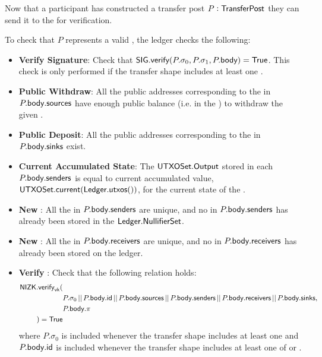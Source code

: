 Now that a participant has constructed a transfer post $P : {\textsf{TransferPost}}$ they can send it to the \Ledger{} for verification. 

\begin{definition}
    To check that $P$ represents a valid \Transfer{}, the ledger checks the following:
    \begin{itemize}
        \item \textbf{Verify Signature}: Check that ${\textsf{SIG}}.{\textsf{verify}}(P.\sigma_0, P.\sigma_1, P.{\textsf{body}}) = {\textsf{True}}$. This check is only performed if the transfer shape includes at least one \Sender{}.
        \item \textbf{Public Withdraw}: All the public addresses corresponding to the  in $P.{\textsf{body}}.{\textsf{sources}}$ have enough public balance (i.e. in the \PublicLedger{}) to withdraw the given \Asset{}.
        \item \textbf{Public Deposit}: All the public addresses corresponding to the  in $P.{\textsf{body}}.{\textsf{sinks}}$ exist.
        \item \textbf{Current Accumulated State}: The ${\textsf{UTXOSet}}.{\textsf{Output}}$ stored in each $P.{\textsf{body}}.{\textsf{senders}}$ is equal to current accumulated value, ${\textsf{UTXOSet}}.{\textsf{current}}({\textsf{Ledger}}.{\textsf{utxos}}())$, for the current state of the \Ledger{}.
        \item \textbf{New }: All the  in $P.{\textsf{body}}.{\textsf{senders}}$ are unique, and no \Nullifier{} in $P.{\textsf{body}}.{\textsf{senders}}$ has already been stored in the ${\textsf{Ledger}}.{\textsf{NullifierSet}}$.
        \item \textbf{New }: All the  in $P.{\textsf{body}}.{\textsf{receivers}}$ are unique, and no \UTXO{} in $P.{\textsf{body}}.{\textsf{receivers}}$ has already been stored on the ledger.
        \item \textbf{Verify \Transfer{}}: Check that the following relation holds:
            \begin{align*}
                {\textsf{NIZK}}.{\textsf{verify}}_{\textsf{vk}}(& \\
                    &P.\sigma_0 \,||\, P.{\textsf{body}}.{\textsf{id}} \,||\, P.{\textsf{body}}.{\textsf{sources}} \,||\, P.{\textsf{body}}.{\textsf{senders}} \,||\, P.{\textsf{body}}.{\textsf{receivers}} \,||\, P.{\textsf{body}}.{\textsf{sinks}}, \\
                    &P.{\textsf{body}}.\pi \\
                ) = {\textsf{True}}
            \end{align*}
            where $P.\sigma_0$ is included whenever the transfer shape includes at least one \Sender{} and $P.{\textsf{body}}.{\textsf{id}}$ is included whenever the transfer shape includes at least one of  or .
    \end{itemize}
\end{definition}


